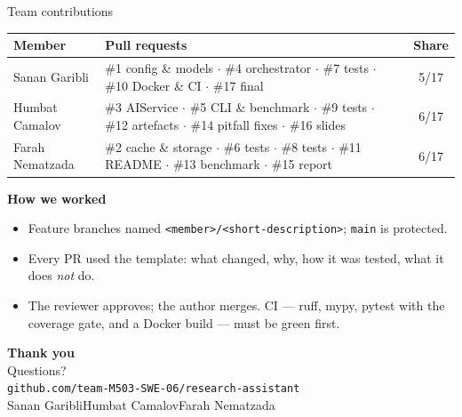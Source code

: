 \documentclass[aspectratio=169,11pt]{beamer}
\newcommand{\memberone}{Sanan Garibli}
\newcommand{\membertwo}{Humbat Camalov}
\newcommand{\memberthree}{Farah Nematzada}
\newcommand{\repolink}{github.com/team-M503-SWE-06/research-assistant}
\begin{document}
\begin{frame}{Team contributions}
  \begin{center}\scriptsize
  \begin{tabularx}{\textwidth}{@{}lXc@{}}
    \toprule
    \textbf{Member} & \textbf{Pull requests} & \textbf{Share} \\
    \midrule
    Sanan Garibli & \#1 config \& models $\cdot$ \#4 orchestrator $\cdot$ \#7 tests $\cdot$ \#10 Docker \& CI $\cdot$ \#17 final & 5/17 \\
    \addlinespace
    Humbat Camalov & \#3 AIService $\cdot$ \#5 CLI \& benchmark $\cdot$ \#9 tests $\cdot$ \#12 artefacts $\cdot$ \#14 pitfall fixes $\cdot$ \#16 slides & 6/17 \\
    \addlinespace
    Farah Nematzada & \#2 cache \& storage $\cdot$ \#6 tests $\cdot$ \#8 tests $\cdot$ \#11 README $\cdot$ \#13 benchmark $\cdot$ \#15 report & 6/17 \\
    \bottomrule
  \end{tabularx}
  \end{center}

  \vspace{0.5em}
  \textbf{How we worked}
  \begin{itemize}\setlength\itemsep{2pt}
    \item Feature branches named \texttt{<member>/<short-description>}; \texttt{main} is protected.
    \item Every PR used the template: what changed, why, how it was tested, what it does \emph{not} do.
    \item The reviewer approves; the author merges. CI --- ruff, mypy, pytest with the coverage gate,
    and a Docker build --- must be green first.
  \end{itemize}
\end{frame}

{%
\begin{frame}[plain]
  \begin{center}
    \vspace{1.6cm}
    {\Huge\bfseries\color{accent} Thank you}\\[0.6em]
    {\large Questions?}\\[1.4cm]
    {\footnotesize\texttt{\repolink}}\\[0.4em]
    {\footnotesize \memberone\quad\textbullet\quad\membertwo\quad\textbullet\quad\memberthree}
  \end{center}
\end{frame}
}
\end{document}
